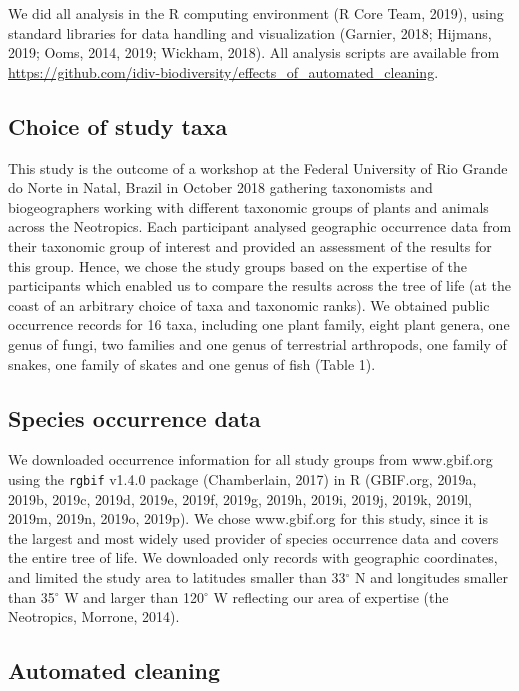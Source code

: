 \documentclass[
  12pt,
]{article}
\begin{document}
We did all analysis in the R computing environment (R Core Team, 2019), using standard libraries for data handling and visualization (Garnier, 2018; Hijmans, 2019; Ooms, 2014, 2019; Wickham, 2018). All analysis scripts are available from \url{https://github.com/idiv-biodiversity/effects_of_automated_cleaning}.

\hypertarget{choice-of-study-taxa}{%
\subsection{Choice of study taxa}\label{choice-of-study-taxa}}

This study is the outcome of a workshop at the Federal University of Rio Grande do Norte in Natal, Brazil in October 2018 gathering taxonomists and biogeographers working with different taxonomic groups of plants and animals across the Neotropics. Each participant analysed geographic occurrence data from their taxonomic group of interest and provided an assessment of the results for this group. Hence, we chose the study groups based on the expertise of the participants which enabled us to compare the results across the tree of life (at the coast of an arbitrary choice of taxa and taxonomic ranks). We obtained public occurrence records for 16 taxa, including one plant family, eight plant genera, one genus of fungi, two families and one genus of terrestrial arthropods, one family of snakes, one family of skates and one genus of fish (Table 1).

\hypertarget{species-occurrence-data}{%
\subsection{Species occurrence data}\label{species-occurrence-data}}

We downloaded occurrence information for all study groups from www.gbif.org using the \texttt{rgbif} v1.4.0 package (Chamberlain, 2017) in R (GBIF.org, 2019a, 2019b, 2019c, 2019d, 2019e, 2019f, 2019g, 2019h, 2019i, 2019j, 2019k, 2019l, 2019m, 2019n, 2019o, 2019p). We chose www.gbif.org for this study, since it is the largest and most widely used provider of species occurrence data and covers the entire tree of life. We downloaded only records with geographic coordinates, and limited the study area to latitudes smaller than 33\(^\circ\) N and longitudes smaller than 35\(^\circ\) W and larger than 120\(^\circ\) W reflecting our area of expertise (the Neotropics, Morrone, 2014).

\hypertarget{automated-cleaning}{%
\subsection{Automated cleaning}\label{automated-cleaning}}
\end{document}
